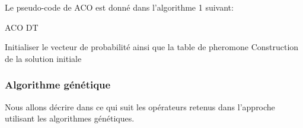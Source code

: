 \begin{enumerate}
Le pseudo-code de ACO est donné dans l’algorithme 1 suivant:

\begin{algorithm}[H]
\caption{ACO DT}
\SetAlgoLined
\DontPrintSemicolon

Initialiser le vecteur de probabilité ainsi que la table de pheromone \;
Construction de la solution initiale \;

	
\end{algorithm}
	
\end{enumerate}



\subsubsection{Algorithme génétique}
Nous allons décrire dans ce qui suit les opérateurs retenus dans l'approche utilisant les algorithmes génétiques. 



